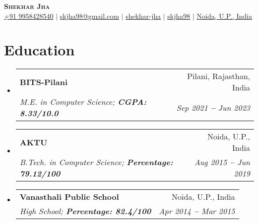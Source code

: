 \documentclass[letterpaper,9pt]{article}
\makeatletter
\newcommand{\resumeSubheading}[4]{
  \vspace{-2pt}\item
    \begin{tabular*}{0.97\textwidth}[t]{l@{\extracolsep{\fill}}r}
      \textbf{#1} & #2 \\
      \textit{\small#3} & \textit{\small #4} \\
    \end{tabular*}\vspace{-7pt}
}
\newcommand{\resumeEducationHeading}[4]{
  \vspace{-2pt}\item
    \begin{tabular*}{0.97\textwidth}[t]{l@{\extracolsep{\fill}}r}
      \textbf{#1} & #2 \\
      \textit{\small#3} & \textit{\small #4} \\
    \end{tabular*}\vspace{-5pt}
}
\newcommand{\resumeSubHeadingListStart}{\begin{itemize}[leftmargin=0.15in, label={}]}
\newcommand{\resumeSubHeadingListEnd}{\end{itemize}}
\makeatother
\begin{document}

\begin{center}
    \textbf{\Huge \scshape Shekhar Jha} \\ \vspace{3pt}
    \small
    \faMobile \hspace{.5pt} \href{tel:919958428540}{+91 9958428540}
    $|$
    \faAt \hspace{.5pt} \href{mailto:skjha98@gmail.com}{skjha98@gmail.com}
    $|$
    \faLinkedinSquare \hspace{.5pt} \href{https://www.linkedin.com/in/shekhar-jha/}{shekhar-jha}
    $|$
    \faGithub \hspace{.5pt} \href{https://github.com/skjha98}{skjha98}
    $|$
    \faMapMarker \hspace{.5pt} \href{https://www.google.com/maps/place/Noida,+Uttar+Pradesh/@28.5222018,77.4018255,12z/data=!3m1!4b1!4m6!3m5!1s0x390ce5a43173357b:0x37ffce30c87cc03f!8m2!3d28.5355161!4d77.3910265!16zL20vMDN3dHow?entry=ttu}{Noida, U.P., India}
\end{center}




\section{Education}
  \vspace{3pt}
  \resumeSubHeadingListStart
    
    \resumeEducationHeading
      {BITS-Pilani}{Pilani, Rajasthan, India}
      {M.E. in Computer Science;   \textbf{CGPA: 8.33/10.0}}{Sep 2021 \textbf{--} Jun 2023}
    
    \resumeSubheading
      {AKTU}{Noida, U.P., India}
      {B.Tech. in Computer Science;   \textbf{Percentage: 79.12/100}}{Aug 2015 \textbf{--} Jun 2019}
    \resumeSubheading
      {Vanasthali Public School}{Noida, U.P., India}
      {High School;   \textbf{Percentage: 82.4/100}}{Apr 2014 \textbf{--} Mar 2015}
    
  \resumeSubHeadingListEnd




  
\end{document}
